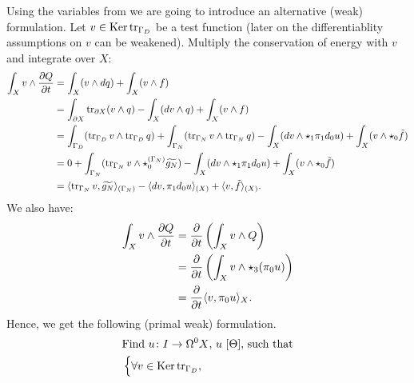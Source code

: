 \begin{discussion}
  Using the variables from
  we are going to introduce an alternative (weak) formulation.
  Let $v \in \mathop{\rm Ker}\nolimits \mathop{\rm tr}\nolimits_{\Gamma_D}$ be a test function
  (later on the differentiablity assumptions on $v$ can be weakened).
  Multiply the conservation of energy with $v$ and integrate over $X$:
  \begin{equation}
    \begin{split}
      \int_X v \wedge \frac{\partial Q}{\partial t}
      & = \int_X (v \wedge d q) + \int_X (v \wedge f) \\
      & = \int_{\partial X} \mathop{\rm tr}\nolimits_{\partial X} (v \wedge q)
        - \int_X (d v \wedge q)
        + \int_X (v \wedge f) \\
      & = \int_{\Gamma_D} (\mathop{\rm tr}\nolimits_{\Gamma_D} v \wedge \mathop{\rm tr}\nolimits_{\Gamma_D} q)
        + \int_{\Gamma_N} (\mathop{\rm tr}\nolimits_{\Gamma_N} v \wedge \mathop{\rm tr}\nolimits_{\Gamma_N} q)
        - \int_X (d v \wedge \star_1 \pi_1 d_0 u)
        + \int_X (v \wedge \star_0 \tilde{f}) \\
      & = 0
        + \int_{\Gamma_N}
          (\mathop{\rm tr}\nolimits_{\Gamma_N} v \wedge \star^{(\Gamma_N)}_0 \widetilde{g_N})
        - \int_X (d v \wedge \star_1 \pi_1 d_0 u)
        + \int_X (v \wedge \star_0 \tilde{f}) \\
      & = \langle\mathop{\rm tr}\nolimits_{\Gamma_N} v,\widetilde{g_N}\rangle_{(\Gamma_N)}
        - \langle d v,\pi_1 d_0 u\rangle_{(X)}
        + \langle v,\tilde{f}\rangle_{(X)}.
    \end{split}
  \end{equation}
  We also have:
  \begin{equation}
    \begin{split}
      \int_X v \wedge \frac{\partial Q}{\partial t}
      & = \frac{\partial}{\partial t} \left(\int_X v \wedge Q\right) \\
      & = \frac{\partial}{\partial t}
          \left(\int_X v \wedge \star_3 (\pi_0 u)\right) \\
      & = \frac{\partial}{\partial t} \langle v,\pi_0 u\rangle_X.
    \end{split}
  \end{equation}
  Hence, we get the following (primal weak) formulation.
  \begin{equation}
    \begin{split}
      & \text{Find $u \colon I \to \Omega^0 X$, $u\ [\Theta]$, such that} \\
      &
      \begin{cases}
        \forall v \in \mathop{\rm Ker}\nolimits \mathop{\rm tr}\nolimits_{\Gamma_D},\

\end{cases}
\end{split}
\end{equation}
\end{discussion}
